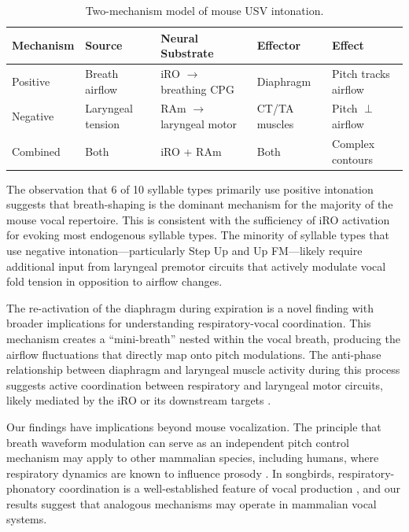 \documentclass[11pt]{article}
\begin{document}
\begin{table}[H]
\centering
\caption{Two-mechanism model of mouse USV intonation.}
\label{tab:model}
\begin{tabular}{lllll}
\toprule
\textbf{Mechanism} & \textbf{Source} & \textbf{Neural Substrate} & \textbf{Effector} & \textbf{Effect} \\
\midrule
Positive & Breath airflow & iRO $\rightarrow$ breathing CPG & Diaphragm & Pitch tracks airflow \\
Negative & Laryngeal tension & RAm $\rightarrow$ laryngeal motor & CT/TA muscles & Pitch $\perp$ airflow \\
Combined & Both & iRO + RAm & Both & Complex contours \\
\bottomrule
\end{tabular}
\end{table}

The observation that 6 of 10 syllable types primarily use positive intonation suggests that breath-shaping is the dominant mechanism for the majority of the mouse vocal repertoire. This is consistent with the sufficiency of iRO activation for evoking most endogenous syllable types. The minority of syllable types that use negative intonation---particularly Step Up and Up FM---likely require additional input from laryngeal premotor circuits that actively modulate vocal fold tension in opposition to airflow changes.

The re-activation of the diaphragm during expiration is a novel finding with broader implications for understanding respiratory-vocal coordination. This mechanism creates a ``mini-breath'' nested within the vocal breath, producing the airflow fluctuations that directly map onto pitch modulations. The anti-phase relationship between diaphragm and laryngeal muscle activity during this process suggests active coordination between respiratory and laryngeal motor circuits, likely mediated by the iRO or its downstream targets \citep{feldman2013breathing, smith2013brainstem}.

Our findings have implications beyond mouse vocalization. The principle that breath waveform modulation can serve as an independent pitch control mechanism may apply to other mammalian species, including humans, where respiratory dynamics are known to influence prosody \citep{lieberman1967intonation}. In songbirds, respiratory-phonatory coordination is a well-established feature of vocal production \citep{suthers1990motor, amador2013elemental}, and our results suggest that analogous mechanisms may operate in mammalian vocal systems.
\end{document}

